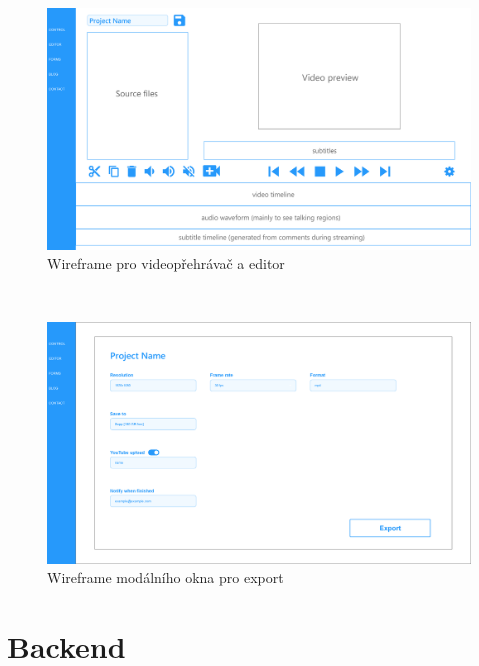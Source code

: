 \documentclass[thesis=M,czech]{FITthesis}[2012/06/26]
\begin{document}
\\
\begin{figure}[h]\centering
	\includegraphics[width=1\textwidth]{images/ui_wf_ulab-editor-1.eps}
	\caption{Wireframe pro videopřehrávač a editor}\label{img:navrh_frontend_ui_wf_editor}
\end{figure}
\\
\begin{figure}[h]\centering
	\includegraphics[width=1\textwidth]{images/ui_wf_ulab-editor-export.eps}
	\caption{Wireframe modálního okna pro export}\label{img:navrh_frontend_ui_wf_export}
\end{figure}

\section{Backend} \label{sec:navrh_backend}
\end{document}
